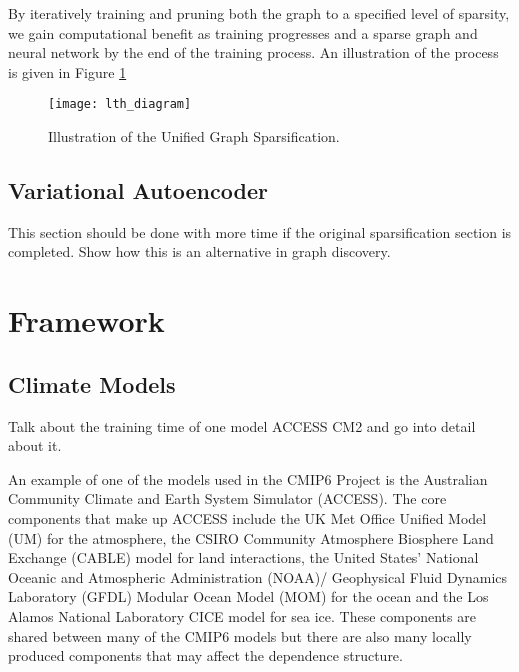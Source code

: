 \documentclass[honours,12pt]{unswthesis}
\numberwithin{equation}{section}
\begin{document}
\noindent By iteratively training and pruning both the graph to a specified level of sparsity, we gain computational benefit as training progresses and a sparse graph 
and neural network by the end of the training process. An illustration of the process is given in Figure \ref{fig:ugs_ill}

\begin{figure}[H]
    \centering
    \texttt{[image: lth\_diagram]}
    \caption{Illustration of the Unified Graph Sparsification.}
    \label{fig:ugs_ill}
\end{figure}

\section{Variational Autoencoder}\label{vgae}
This section should be done with more time if the original sparsification section is completed.
Show how this is an alternative in graph discovery.




\chapter{Framework}\label{framework}



\section{Climate Models}\label{climate}
Talk about the training time of one model ACCESS CM2 and go into detail about it.

\noindent An example of one of the models used in the CMIP6 Project is the Australian Community Climate and Earth System Simulator (ACCESS).\cite{bi2020configuration}
The core components that make up ACCESS include the UK Met Office Unified Model (UM) for the atmosphere\cite{walters2019met},
the CSIRO Community Atmosphere Biosphere Land Exchange (CABLE) model for land interactions\cite{law2012community},
the United States' National Oceanic and Atmospheric Administration (NOAA)/ Geophysical Fluid Dynamics Laboratory (GFDL) Modular Ocean Model (MOM) for the ocean\cite{adcroft2019gfdl}
and the Los Alamos National Laboratory CICE model for sea ice.\cite{hunke2010cice}
These components are shared between many of the CMIP6 models but there are also many locally produced components that may affect the dependence structure. \\ 
\end{document}
